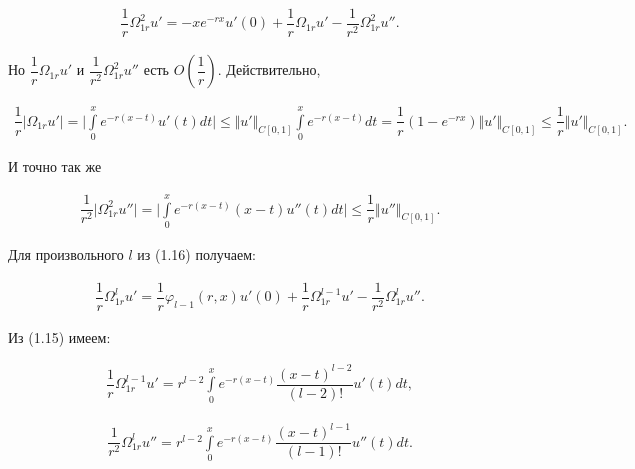 \begin{equation}
\begin{array}{c}
\nonumber

\dfrac{1}{r}\Omega_{1r}^2u' = -xe^{-rx}u'(0) + \dfrac{1}{r}\Omega_{1r}u' - \dfrac{1}{r^2}\Omega_{1r}^2u''.

\end{array}
\end{equation}

Но $ \dfrac{1}{r}\Omega_{1r}u' $ и $ \dfrac{1}{r^2}\Omega_{1r}^2u'' $ есть $ O(\dfrac{1}{r}) $. Действительно,

\begin{equation}
\begin{array}{c}
\nonumber

\dfrac{1}{r}\vert\Omega_{1r}u'\vert = \bigl\vert \int\limits_0^x e^{-r(x-t)}u'(t)dt \bigr\vert \leq \Vert u' \Vert_{C[0,1]} \int\limits_0^x e^{-r(x-t)}dt = \dfrac{1}{r}(1 - e^{-rx})\Vert u' \Vert_{C[0,1]} \leq \dfrac{1}{r} \Vert u' \Vert_{C[0,1]}.

\end{array}
\end{equation}

И точно так же

\begin{equation}
\begin{array}{c}
\nonumber

\dfrac{1}{r^2} \vert \Omega_{1r}^2u'' \vert = \bigl| \int\limits_0^x e^{-r(x-t)}(x-t)u''(t)dt \bigr| \leq \dfrac{1}{r} \Vert u'' \Vert_{C[0,1]}.

\end{array}
\end{equation}

Для произвольного $ l $ из (1.16) получаем:

\begin{equation}
\begin{array}{c}

\dfrac{1}{r} \Omega_{1r}^lu' = \dfrac{1}{r} \varphi_{l-1}(r,x)u'(0) + \dfrac{1}{r}\Omega_{1r}^{l-1}u' - \dfrac{1}{r^2} \Omega_{1r}^lu''.

\end{array}
\end{equation}

Из (1.15) имеем:

\begin{equation}
\begin{array}{c}

\dfrac{1}{r}\Omega_{1r}^{l-1}u' = r^{l-2}\int\limits_0^x e^{-r(x-t)}\dfrac{(x-t)^{l-2}}{(l-2)!}u'(t)dt,

\end{array}
\end{equation}

\begin{equation}
\begin{array}{c}

\dfrac{1}{r^2} \Omega_{1r}^lu'' = r^{l-2}\int\limits_0^x e^{-r(x-t)}\dfrac{(x-t)^{l-1}}{(l-1)!}u''(t)dt.

\end{array}
\end{equation}




